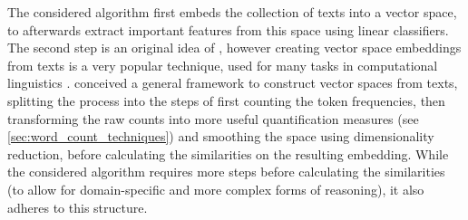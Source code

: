 The considered algorithm first embeds the collection of texts into a vector space, to afterwards extract important features from this space using linear classifiers. The second step is an original idea of \cite{Derrac2015}, however creating vector space embeddings from texts is a very popular technique, used for many tasks in computational linguistics \cite{Mikolov:Regularities,Mikolov2013a,Guo,Lowe,Turney2010}. %
 \textcite{Lowe} conceived a general framework to construct vector spaces from texts, splitting the process into the steps of first counting the token frequencies, then transforming the raw counts into more useful quantification measures (see \ref{sec:word_count_techniques}) %
  and smoothing the space using dimensionality reduction, before calculating the similarities on the resulting embedding. While the considered algorithm requires more steps before calculating the similarities (to allow for domain-specific and more complex forms of reasoning), it also adheres to this structure.




